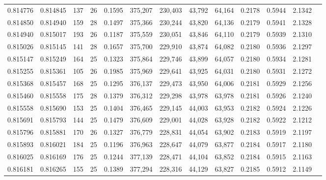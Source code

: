 \begin{tabular}{rrrrrrrrrrrrr}
0.814776 & 0.814845 &   137 &  26 &                                     0.1595 & 375,207 & 230,403 &  43,792 &  64,164 & 0.2178 & 0.5944 & 2.1342 \\
0.814850 & 0.814940 &   159 &  28 &                                     0.1497 & 375,366 & 230,244 &  43,820 &  64,136 & 0.2179 & 0.5941 & 2.1328 \\
0.814940 & 0.815017 &   193 &  26 &                                     0.1187 & 375,559 & 230,051 &  43,846 &  64,110 & 0.2179 & 0.5939 & 2.1310 \\
0.815026 & 0.815145 &   141 &  28 &                                     0.1657 & 375,700 & 229,910 &  43,874 &  64,082 & 0.2180 & 0.5936 & 2.1297 \\
0.815147 & 0.815249 &   164 &  25 &                                     0.1323 & 375,864 & 229,746 &  43,899 &  64,057 & 0.2180 & 0.5934 & 2.1281 \\
0.815255 & 0.815361 &   105 &  26 &                                     0.1985 & 375,969 & 229,641 &  43,925 &  64,031 & 0.2180 & 0.5931 & 2.1272 \\
0.815368 & 0.815457 &   168 &  25 &                                     0.1295 & 376,137 & 229,473 &  43,950 &  64,006 & 0.2181 & 0.5929 & 2.1256 \\
0.815460 & 0.815558 &   175 &  28 &                                     0.1379 & 376,312 & 229,298 &  43,978 &  63,978 & 0.2181 & 0.5926 & 2.1240 \\
0.815558 & 0.815690 &   153 &  25 &                                     0.1404 & 376,465 & 229,145 &  44,003 &  63,953 & 0.2182 & 0.5924 & 2.1226 \\
0.815691 & 0.815793 &   144 &  25 &                                     0.1479 & 376,609 & 229,001 &  44,028 &  63,928 & 0.2182 & 0.5922 & 2.1212 \\
0.815796 & 0.815881 &   170 &  26 &                                     0.1327 & 376,779 & 228,831 &  44,054 &  63,902 & 0.2183 & 0.5919 & 2.1197 \\
0.815893 & 0.816021 &   184 &  25 &                                     0.1196 & 376,963 & 228,647 &  44,079 &  63,877 & 0.2184 & 0.5917 & 2.1180 \\
0.816025 & 0.816169 &   176 &  25 &                                     0.1244 & 377,139 & 228,471 &  44,104 &  63,852 & 0.2184 & 0.5915 & 2.1163 \\
0.816181 & 0.816265 &   155 &  25 &                                     0.1389 & 377,294 & 228,316 &  44,129 &  63,827 & 0.2185 & 0.5912 & 2.1149 \\

\end{tabular}
